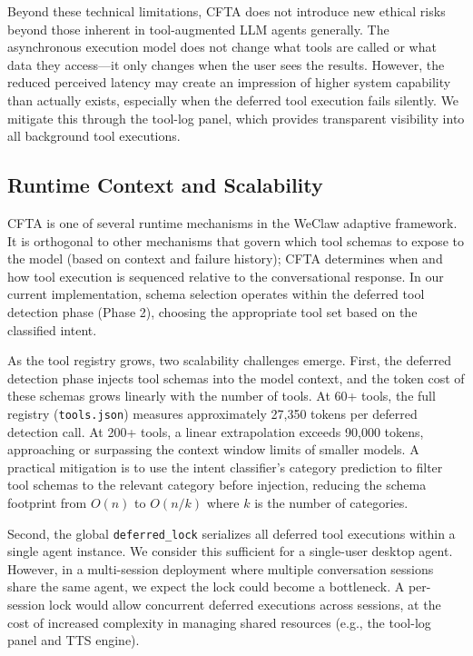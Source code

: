 \documentclass[numbered,mediumone,traditional]{oup-authoring-template}
\begin{document}
Beyond these technical limitations, CFTA does not introduce new ethical risks beyond those inherent in tool-augmented LLM agents generally. The asynchronous execution model does not change what tools are called or what data they access---it only changes when the user sees the results. However, the reduced perceived latency may create an impression of higher system capability than actually exists, especially when the deferred tool execution fails silently. We mitigate this through the tool-log panel, which provides transparent visibility into all background tool executions.

\subsection{Runtime Context and Scalability}

CFTA is one of several runtime mechanisms in the WeClaw adaptive framework. It is orthogonal to other mechanisms that govern which tool schemas to expose to the model (based on context and failure history); CFTA determines when and how tool execution is sequenced relative to the conversational response. In our current implementation, schema selection operates within the deferred tool detection phase (Phase 2), choosing the appropriate tool set based on the classified intent.

As the tool registry grows, two scalability challenges emerge. First, the deferred detection phase injects tool schemas into the model context, and the token cost of these schemas grows linearly with the number of tools. At 60+ tools, the full registry (\texttt{tools.json}) measures approximately 27,350 tokens per deferred detection call. At 200+ tools, a linear extrapolation exceeds 90,000 tokens, approaching or surpassing the context window limits of smaller models. A practical mitigation is to use the intent classifier's category prediction to filter tool schemas to the relevant category before injection, reducing the schema footprint from $O(n)$ to $O(n/k)$ where $k$ is the number of categories.

Second, the global \texttt{deferred\_lock} serializes all deferred tool executions within a single agent instance. We consider this sufficient for a single-user desktop agent. However, in a multi-session deployment where multiple conversation sessions share the same agent, we expect the lock could become a bottleneck. A per-session lock would allow concurrent deferred executions across sessions, at the cost of increased complexity in managing shared resources (e.g., the tool-log panel and TTS engine).
\end{document}
